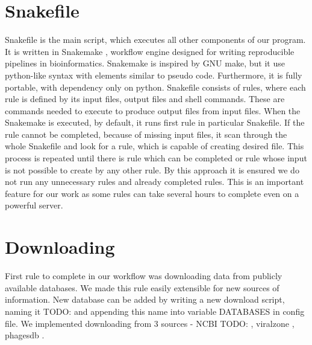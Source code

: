 \section{Snakefile}
Snakefile is the main script, which executes all other components of our program. 
It is written in Snakemake \cite{snakemake}, workflow engine designed for writing reproducible pipelines in bioinformatics. 
Snakemake is inspired by GNU make, but it use python-like syntax with elements similar to pseudo code.
Furthermore, it is fully portable, with dependency only on python.
Snakefile consists of rules, where each rule is defined by its input files, output files and shell commands.
These are commands needed to execute to produce output files from input files.
When the Snakemake is executed, by default, it runs first rule in particular Snakefile. 
If the rule cannot be completed, because of missing input files, it scan through the whole Snakefile and look for a rule, which is capable of creating desired file. 
This process is repeated until there is rule which can be completed or rule whose input is not possible to create by any other rule.
By this approach it is ensured we do not run any unnecessary rules and already completed rules.
This is an important feature for our work as some rules can take several hours to complete even on a powerful server. 

\section{Downloading}
First rule to complete in our workflow was downloading data from publicly available databases.
We made this rule easily extensible for new sources of information.
New database can be added by writing a new download script, 
naming it TODO:
and appending this name into variable DATABASES in config file.
We implemented downloading from 3 sources - NCBI TODO:
, viralzone 
, phagesdb 
.

